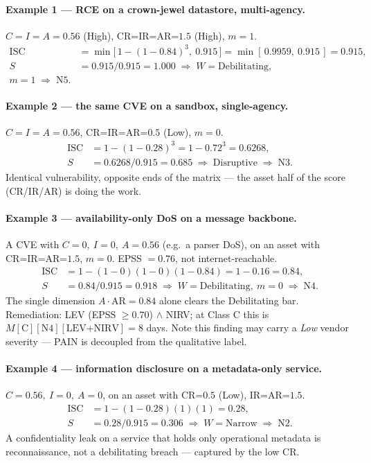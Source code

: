 \documentclass[11pt]{article}
\begin{document}
\paragraph{Example 1 --- RCE on a crown-jewel datastore, multi-agency.}
$C\!=\!I\!=\!A\!=\!0.56$ (High), CR=IR=AR=$1.5$ (High), $m=1$.
\begin{align*}
\mathrm{ISC} &= \min\!\big[\,1-(1-0.84)^3,\ 0.915\,\big] = \min[\,0.9959,\ 0.915\,] = 0.915, \\
S &= 0.915/0.915 = 1.000 \;\Rightarrow\; W=\text{Debilitating}, \\
m=1 \;\Rightarrow\; \boxed{\text{N5}}.
\end{align*}

\paragraph{Example 2 --- the same CVE on a sandbox, single-agency.}
$C\!=\!I\!=\!A\!=\!0.56$, CR=IR=AR=$0.5$ (Low), $m=0$.
\begin{align*}
\mathrm{ISC} &= 1-(1-0.28)^3 = 1-0.72^3 = 0.6268, \\
S &= 0.6268/0.915 = 0.685 \;\Rightarrow\; \text{Disruptive} \;\Rightarrow\; \boxed{\text{N3}}.
\end{align*}
Identical vulnerability, opposite ends of the matrix --- the asset half of the
score (CR/IR/AR) is doing the work.

\paragraph{Example 3 --- availability-only DoS on a message backbone.}
A CVE with $C\!=\!0,\ I\!=\!0,\ A\!=\!0.56$ (e.g.\ a parser DoS), on an asset with
CR=IR=AR=$1.5$, $m=0$. EPSS $=0.76$, not internet-reachable.
\begin{align*}
\mathrm{ISC} &= 1-(1-0)(1-0)(1-0.84) = 1-0.16 = 0.84, \\
S &= 0.84/0.915 = 0.918 \;\Rightarrow\; W=\text{Debilitating},\ m=0 \;\Rightarrow\; \boxed{\text{N4}}.
\end{align*}
The single dimension $A\!\cdot\!\mathrm{AR}=0.84$ alone clears the Debilitating bar.
Remediation: LEV (EPSS $\ge 0.70$) $\land$ NIRV; at Class C this is
$M[\text{C}][\text{N4}][\text{LEV+NIRV}] = 8$ days. Note this finding may carry a
\emph{Low} vendor severity --- PAIN is decoupled from the qualitative label.

\paragraph{Example 4 --- information disclosure on a metadata-only service.}
$C\!=\!0.56,\ I\!=\!0,\ A\!=\!0$, on an asset with CR=$0.5$ (Low), IR=AR=$1.5$.
\begin{align*}
\mathrm{ISC} &= 1-(1-0.28)(1)(1) = 0.28, \\
S &= 0.28/0.915 = 0.306 \;\Rightarrow\; W=\text{Narrow} \;\Rightarrow\; \boxed{\text{N2}}.
\end{align*}
A confidentiality leak on a service that holds only operational metadata is
reconnaissance, not a debilitating breach --- captured by the low CR.
\end{document}
